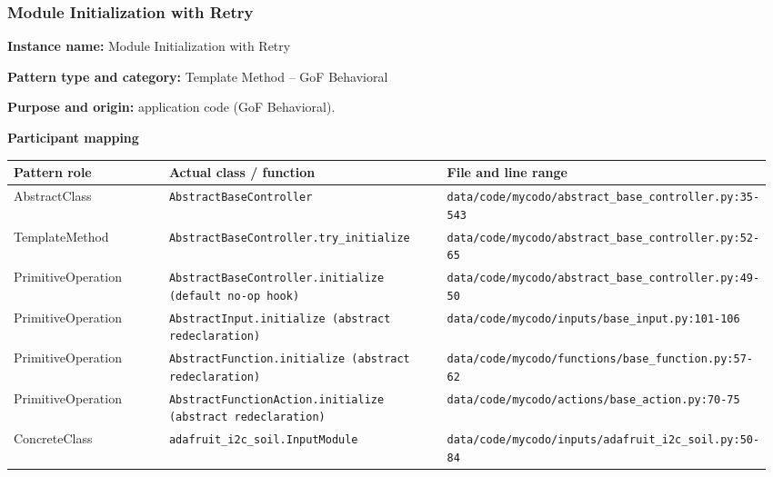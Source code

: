 \documentclass[11pt,a4paper]{article}
\newcommand{\field}[2]{\textbf{#1:} #2\par}
\begin{document}
\subsubsection{Module Initialization with Retry}
\field{Instance name}{Module Initialization with Retry}
\field{Pattern type and category}{Template Method -- GoF Behavioral}
\field{Purpose and origin}{application code (GoF Behavioral).}
\textbf{Participant mapping}\par
{\small\setlength{\tabcolsep}{3pt}
\begin{longtable}{@{}P{0.21\linewidth}P{0.37\linewidth}P{0.39\linewidth}@{}}\toprule
\textbf{Pattern role} & \textbf{Actual class / function} & \textbf{File and line range} \\ \midrule\endhead
AbstractClass & \texttt{AbstractBaseController} & \texttt{data/\allowbreak{}code/\allowbreak{}mycodo/\allowbreak{}abstract\_\allowbreak{}base\_\allowbreak{}controller.\allowbreak{}py:35-543} \\
TemplateMethod & \texttt{AbstractBaseController.\allowbreak{}try\_\allowbreak{}initialize} & \texttt{data/\allowbreak{}code/\allowbreak{}mycodo/\allowbreak{}abstract\_\allowbreak{}base\_\allowbreak{}controller.\allowbreak{}py:52-65} \\
PrimitiveOperation & \texttt{AbstractBaseController.\allowbreak{}initialize (default no-op hook)} & \texttt{data/\allowbreak{}code/\allowbreak{}mycodo/\allowbreak{}abstract\_\allowbreak{}base\_\allowbreak{}controller.\allowbreak{}py:49-50} \\
PrimitiveOperation & \texttt{AbstractInput.\allowbreak{}initialize (abstract redeclaration)} & \texttt{data/\allowbreak{}code/\allowbreak{}mycodo/\allowbreak{}inputs/\allowbreak{}base\_\allowbreak{}input.\allowbreak{}py:101-106} \\
PrimitiveOperation & \texttt{AbstractFunction.\allowbreak{}initialize (abstract redeclaration)} & \texttt{data/\allowbreak{}code/\allowbreak{}mycodo/\allowbreak{}functions/\allowbreak{}base\_\allowbreak{}function.\allowbreak{}py:57-62} \\
PrimitiveOperation & \texttt{AbstractFunctionAction.\allowbreak{}initialize (abstract redeclaration)} & \texttt{data/\allowbreak{}code/\allowbreak{}mycodo/\allowbreak{}actions/\allowbreak{}base\_\allowbreak{}action.\allowbreak{}py:70-75} \\
ConcreteClass & \texttt{adafruit\_\allowbreak{}i2c\_\allowbreak{}soil.\allowbreak{}InputModule} & \texttt{data/\allowbreak{}code/\allowbreak{}mycodo/\allowbreak{}inputs/\allowbreak{}adafruit\_\allowbreak{}i2c\_\allowbreak{}soil.\allowbreak{}py:50-84} \\

\end{longtable}}
\end{document}
